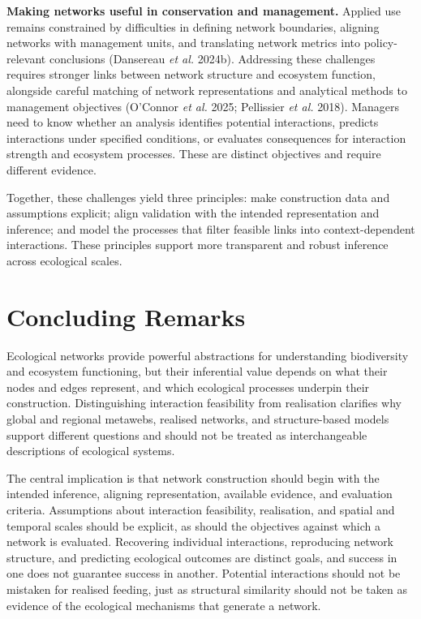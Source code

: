 \documentclass[
]{article}
\begin{document}
\textbf{Making networks useful in conservation and management.} Applied
use remains constrained by difficulties in defining network boundaries,
aligning networks with management units, and translating network metrics
into policy-relevant conclusions (Dansereau \emph{et al.} 2024b).
Addressing these challenges requires stronger links between network
structure and ecosystem function, alongside careful matching of network
representations and analytical methods to management objectives
(O'Connor \emph{et al.} 2025; Pellissier \emph{et al.} 2018). Managers
need to know whether an analysis identifies potential interactions,
predicts interactions under specified conditions, or evaluates
consequences for interaction strength and ecosystem processes. These are
distinct objectives and require different evidence.

Together, these challenges yield three principles: make construction
data and assumptions explicit; align validation with the intended
representation and inference; and model the processes that filter
feasible links into context-dependent interactions. These principles
support more transparent and robust inference across ecological scales.

\section{Concluding Remarks}\label{concluding-remarks}

Ecological networks provide powerful abstractions for understanding
biodiversity and ecosystem functioning, but their inferential value
depends on what their nodes and edges represent, and which ecological
processes underpin their construction. Distinguishing interaction
feasibility from realisation clarifies why global and regional metawebs,
realised networks, and structure-based models support different
questions and should not be treated as interchangeable descriptions of
ecological systems.

The central implication is that network construction should begin with
the intended inference, aligning representation, available evidence, and
evaluation criteria. Assumptions about interaction feasibility,
realisation, and spatial and temporal scales should be explicit, as
should the objectives against which a network is evaluated. Recovering
individual interactions, reproducing network structure, and predicting
ecological outcomes are distinct goals, and success in one does not
guarantee success in another. Potential interactions should not be
mistaken for realised feeding, just as structural similarity should not
be taken as evidence of the ecological mechanisms that generate a
network.
\end{document}
